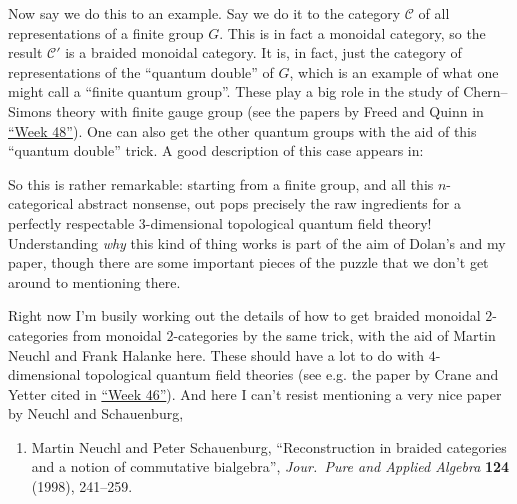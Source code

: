 \documentclass{article}
\def\tightlist{}
\renewcommand{\texttt}[1]{%
  \begingroup
  \ttfamily
  \begingroup\lccode`~=`/\lowercase{\endgroup\def~}{/\discretionary{}{}{}}%
  \begingroup\lccode`~=`[\lowercase{\endgroup\def~}{[\discretionary{}{}{}}%
  \begingroup\lccode`~=`.\lowercase{\endgroup\def~}{.\discretionary{}{}{}}%
  \catcode`/=\active\catcode`[=\active\catcode`.=\active
  \scantokens{#1\noexpand}%
  \endgroup
}
\begin{document}
Now say we do this to an example. Say we do it to the category
\(\mathcal{C}\) of all representations of a finite group \(G\). This is
in fact a monoidal category, so the result \(\mathcal{C}'\) is a braided
monoidal category. It is, in fact, just the category of representations
of the ``quantum double'' of \(G\), which is an example of what one
might call a ``finite quantum group''. These play a big role in the
study of Chern--Simons theory with finite gauge group (see the papers by
Freed and Quinn in \protect\hyperlink{week48}{``Week 48''}). One can
also get the other quantum groups with the aid of this ``quantum
double'' trick. A good description of this case appears in:


So this is rather remarkable: starting from a finite group, and all this
\(n\)-categorical abstract nonsense, out pops precisely the raw
ingredients for a perfectly respectable \(3\)-dimensional topological
quantum field theory! Understanding \emph{why} this kind of thing works
is part of the aim of Dolan's and my paper, though there are some
important pieces of the puzzle that we don't get around to mentioning
there.

Right now I'm busily working out the details of how to get braided
monoidal \(2\)-categories from monoidal \(2\)-categories by the same
trick, with the aid of Martin Neuchl and Frank Halanke here. These
should have a lot to do with \(4\)-dimensional topological quantum field
theories (see e.g. the paper by Crane and Yetter cited in
\protect\hyperlink{week46}{``Week 46''}). And here I can't resist
mentioning a very nice paper by Neuchl and Schauenburg,

\begin{enumerate}
\def\labelenumi{\arabic{enumi})}
\setcounter{enumi}{3}
\tightlist
\item
  Martin Neuchl and Peter Schauenburg, ``Reconstruction in braided categories 
  and a notion of commutative bialgebra'',  \emph{Jour.\ Pure and Applied 
  Algebra} \textbf{124} (1998), 241--259.
\end{enumerate}
\end{document}
